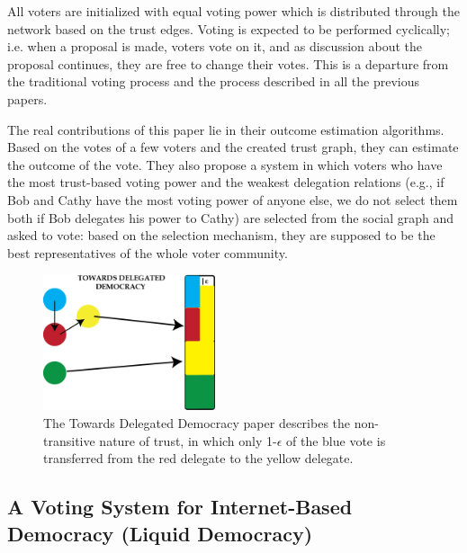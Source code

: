 \documentclass[a4paper]{acm_proc_article-sp}
\begin{document}
All voters are initialized with equal voting power which is distributed through the network based on the trust edges.  Voting
is expected to be performed cyclically; i.e. when a proposal is made, voters vote on it, and as discussion about the proposal
continues, they are free to change their votes.  This is a departure from the traditional voting process and the process
described in all the previous papers.

The real contributions of this paper lie in their outcome estimation algorithms.  Based on the votes of a few voters and the
created trust graph, they can estimate the outcome of the vote.  They also propose a system in which voters who have the most
trust-based voting power and the weakest delegation relations (e.g., if Bob and Cathy have the most voting power of anyone else,
we do not select them both if Bob delegates his power to Cathy) are selected from the social graph and asked to vote: based on
the selection mechanism, they are supposed to be the best representatives of the whole voter community.

\begin{figure}
\centering
\includegraphics[width=0.45\textwidth]{figures/tdd0.png}
\caption{The Towards Delegated Democracy paper describes the non-transitive nature of trust, in which only 1-$\epsilon$ of the blue vote is transferred from the red delegate to the yellow delegate.}
\end{figure}

\subsection{A Voting System for Internet-Based Democracy (Liquid Democracy)}
\end{document}
